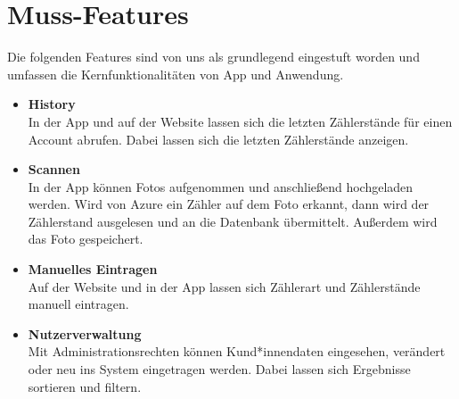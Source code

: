 \section{Muss-Features}
Die folgenden Features sind von uns als grundlegend eingestuft worden und umfassen die Kernfunktionalitäten von App und Anwendung.
\begin{itemize}
\item \textbf{History} \hfill \\
	In der App und auf der Website lassen sich die letzten Zählerstände für einen Account abrufen.
	Dabei lassen sich die letzten Zählerstände anzeigen.
\item \textbf{Scannen} \hfill \\
	In der App können Fotos aufgenommen und anschließend hochgeladen werden. 
	Wird von Azure ein Zähler auf dem Foto erkannt, dann wird der Zählerstand ausgelesen und an die Datenbank übermittelt.
	Außerdem wird das Foto gespeichert.
\item \textbf{Manuelles Eintragen} \hfill \\
	Auf der Website und in der App lassen sich Zählerart und Zählerstände manuell eintragen.
\item \textbf{Nutzerverwaltung} \hfill \\
	Mit Administrationsrechten können Kund*innendaten eingesehen, verändert oder neu ins System eingetragen werden.
	Dabei lassen sich Ergebnisse sortieren und filtern.
\end{itemize}


